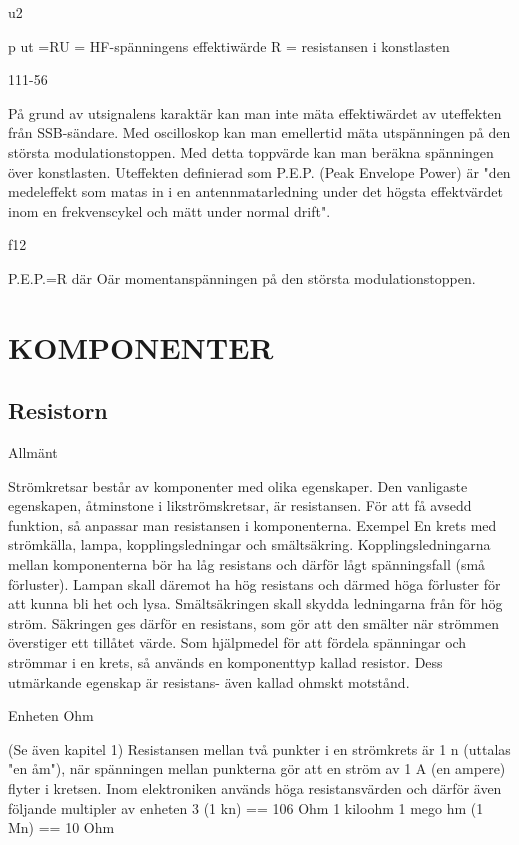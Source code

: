 \documentclass[a4paper,twoside,twocolumn,openright]{book}
\begin{document}
{{u2

p
ut =RU = HF-spänningens effektiwärde
R = resistansen i konstlasten

111-56

På grund av utsignalens karaktär kan
man inte mäta effektiwärdet av uteffekten
från SSB-sändare.
Med oscilloskop kan man emellertid mäta
utspänningen på den största modulationstoppen.
Med detta toppvärde kan man beräkna
spänningen över konstlasten.
Uteffekten definierad som P.E.P. (Peak
Envelope Power) är "den medeleffekt som
matas in i en antennmatarledning under det
högsta effektvärdet inom en frekvenscykel
och mätt under normal drift".

f12

P.E.P.=R
där Oär momentanspänningen på den största
modulationstoppen.


\chapter{KOMPONENTER}

\section{Resistorn}

Allmänt

Strömkretsar består av komponenter med
olika egenskaper. Den vanligaste egenskapen, åtminstone i likströmskretsar, är resistansen. För att få avsedd funktion, så anpassar man resistansen i komponenterna.
Exempel
En krets med strömkälla, lampa, kopplingsledningar och smältsäkring. Kopplingsledningarna mellan komponenterna bör ha
låg resistans och därför lågt spänningsfall
(små förluster). Lampan skall däremot ha
hög resistans och därmed höga förluster för
att kunna bli het och lysa. Smältsäkringen
skall skydda ledningarna från för hög ström.
Säkringen ges därför en resistans, som gör
att den smälter när strömmen överstiger ett
tillåtet värde.
Som hjälpmedel för att fördela spänningar
och strömmar i en krets, så används en
komponenttyp kallad resistor. Dess utmärkande egenskap är resistans- även kallad
ohmskt motstånd.

Enheten Ohm

(Se även kapitel 1)
Resistansen mellan två punkter i en strömkrets är 1 n (uttalas "en åm"), när spänningen mellan punkterna gör att en ström av
1 A (en ampere) flyter i kretsen.
Inom elektroniken används höga resistansvärden och därför även följande multipler av enheten
3
(1 kn) == 106 Ohm
1 kiloohm
1 mego hm
(1 Mn) == 10 Ohm

}}
\end{document}
